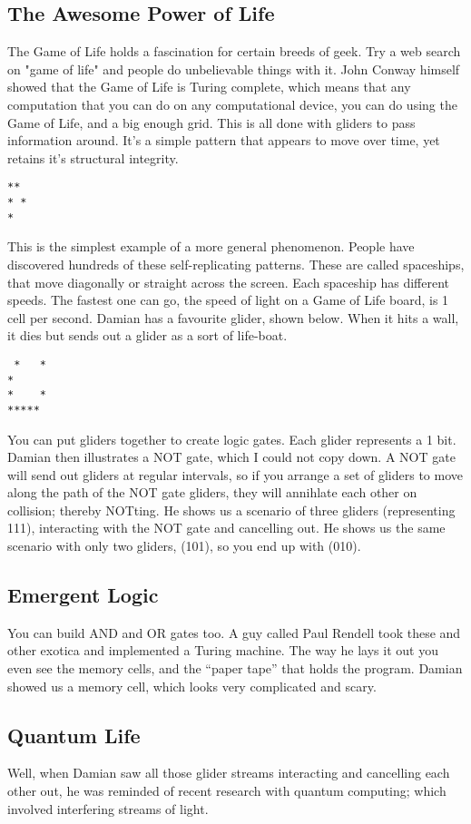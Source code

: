 \documentclass{article}
\begin{document}
\subsection{The Awesome Power of Life}
The Game of Life holds a fascination for certain breeds of geek.  
Try a web search on
"game of life" and people do unbelievable things with it.  John Conway
himself showed that the Game of Life is Turing complete, which means 
that any
computation that you can do on any computational device, you can do
using the Game of Life, and a big enough grid.  This is all done 
with gliders to pass information around.
It's a simple pattern that appears to move over time, yet retains it's
structural integrity.
\begin{verbatim}
**
* *
*
\end{verbatim}
This is the simplest example of a more general phenomenon.  People have
discovered hundreds of these self-replicating patterns.  These are
called spaceships, that move diagonally or straight across the screen.
Each spaceship has different speeds.  The fastest one can go, the
speed of light on a Game of Life board, is 1
cell per second.  Damian has a favourite glider, shown below.  When it
hits a wall, it dies but sends out a glider as a sort of life-boat.
\begin{verbatim}
 *   *
*
*    *
*****
\end{verbatim}

You can put gliders together to create logic gates.  Each glider
represents a 1 bit.  Damian then illustrates a
NOT gate, which I could not copy down.  A NOT gate will send out 
gliders at regular intervals, so if you arrange a set of gliders to
move along the path of the NOT gate gliders, they will annihlate each
other on collision; thereby NOTting.  He shows us a scenario of three 
gliders (representing 111), interacting with the NOT gate and cancelling
out.  He shows us the same scenario with only two
gliders, (101), so you end up with (010).

\subsection{Emergent Logic}
You can build AND and OR gates too.  A guy called Paul Rendell took
these and other exotica and implemented a Turing machine.  The way he
lays it out you even see the memory cells, and the ``paper tape'' that
holds the program.  Damian showed us a memory cell, which looks very
complicated and scary.

\subsection{Quantum Life}
Well, when Damian saw all those glider streams interacting and 
cancelling each other out, he
was reminded of recent research with quantum computing; which
involved interfering streams of light.
\end{document}
